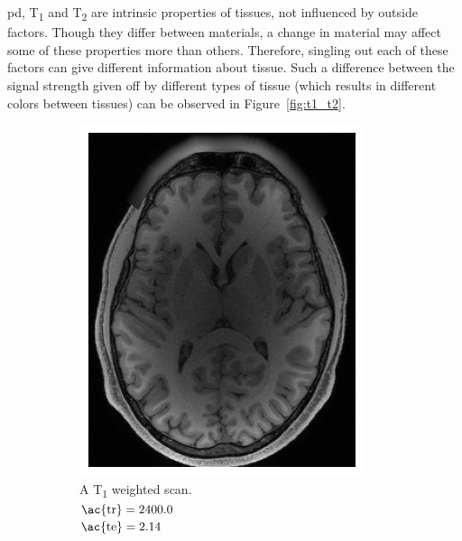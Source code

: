 \ac{pd}, T\textsubscript{1} and T\textsubscript{2} are intrinsic properties of tissues,
not influenced by outside factors. Though they differ between materials, a 
change in material may affect some of these properties more than others. 
Therefore, singling out each of these factors can give different information 
about tissue. Such a difference between the signal strength given off by 
different types of tissue (which results in different colors between tissues) 
can be observed in Figure~\ref{fig:t1_t2}.

\begin{figure}[H]
    \centering
    \begin{subfigure}[t]{0.4\textwidth}
        \includegraphics[width=\textwidth]{img/100206_T1.png}
        \caption{A T\textsubscript{1} weighted scan.\\$\text{\ac{tr}} = 2400.0$\\$\text{\ac{te}} = 2.14$}\label{fig:t1_t2_t1}
    \end{subfigure}
    ~
    \begin{subfigure}[t]{0.4\textwidth}

\end{subfigure}
\end{figure}
